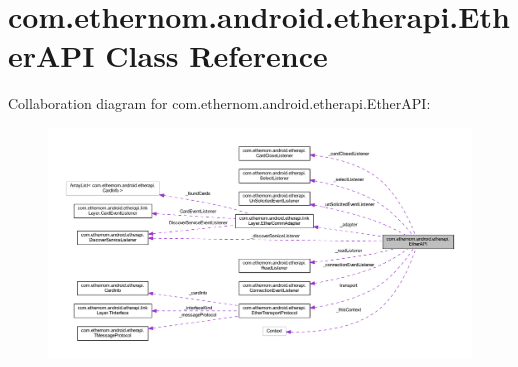 \hypertarget{classcom_1_1ethernom_1_1android_1_1etherapi_1_1_ether_a_p_i}{}\section{com.\+ethernom.\+android.\+etherapi.\+Ether\+A\+PI Class Reference}
\label{classcom_1_1ethernom_1_1android_1_1etherapi_1_1_ether_a_p_i}


Collaboration diagram for com.\+ethernom.\+android.\+etherapi.\+Ether\+A\+PI\+:\nopagebreak
\begin{figure}[H]
\begin{center}
\leavevmode
\includegraphics[width=350pt]{classcom_1_1ethernom_1_1android_1_1etherapi_1_1_ether_a_p_i__coll__graph}
\end{center}
\end{figure}
